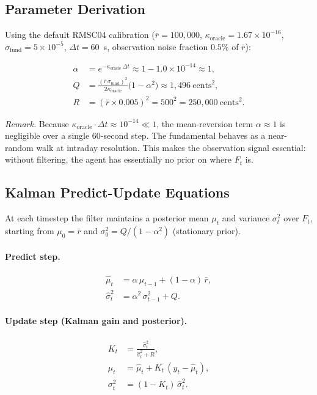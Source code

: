 \documentclass[11pt]{article}
\begin{document}
\subsection{Parameter Derivation}

Using the default RMSC04 calibration ($\bar{r} = 100{,}000$\textcent,
$\kappa_{\text{oracle}} = 1.67 \times 10^{-16}$,
$\sigma_{\text{fund}} = 5 \times 10^{-5}$,
$\Delta t = 60$~s,
observation noise fraction $0.5\%$ of $\bar{r}$):

\begin{align*}
\alpha &= e^{-\kappa_{\text{oracle}}\,\Delta t}
       \approx 1 - 1.0 \times 10^{-14}
       \approx 1,\\
Q      &= \frac{(\bar{r}\,\sigma_{\text{fund}})^2}{2\kappa_{\text{oracle}}}
          \bigl(1 - \alpha^2\bigr)
       \approx 1{,}496\ \text{cents}^2,\\
R      &= (\bar{r} \times 0.005)^2 = 500^2 = 250{,}000\ \text{cents}^2.
\end{align*}

\noindent\textit{Remark.} Because $\kappa_{\text{oracle}} \cdot \Delta t \approx
10^{-14} \ll 1$, the mean-reversion term $\alpha \approx 1$ is negligible over
a single 60-second step. The fundamental behaves as a near-random walk at
intraday resolution. This makes the observation signal essential: without
filtering, the agent has essentially no prior on where $F_t$ is.

\subsection{Kalman Predict-Update Equations}

At each timestep the filter maintains a posterior mean $\mu_t$ and variance
$\sigma^2_t$ over $F_t$, starting from $\mu_0 = \bar{r}$ and
$\sigma^2_0 = Q / (1 - \alpha^2)$ (stationary prior).

\paragraph{Predict step.}
\begin{align*}
\hat{\mu}_t     &= \alpha\,\mu_{t-1} + (1-\alpha)\,\bar{r}, \\
\hat{\sigma}^2_t &= \alpha^2\,\sigma^2_{t-1} + Q.
\end{align*}

\paragraph{Update step (Kalman gain and posterior).}
\begin{align*}
K_t          &= \frac{\hat{\sigma}^2_t}{\hat{\sigma}^2_t + R},\\
\mu_t        &= \hat{\mu}_t + K_t\,(y_t - \hat{\mu}_t),\\
\sigma^2_t   &= (1 - K_t)\,\hat{\sigma}^2_t.
\end{align*}
\end{document}
